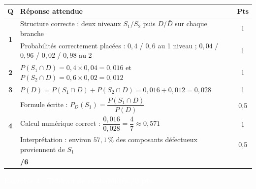 \documentclass[10pt,a4paper]{article}
\newcommand{\exotitle}[2]{%
  \noindent\colorbox{exoheader}{%
    \parbox{\dimexpr\linewidth-2\fboxsep\relax}{%
      \textcolor{white}{\textbf{\large #1 \hfill #2}}%
    }%
  }%
}
\begin{document}
\begin{tabularx}{\linewidth}{|c|X|c|}
  \hline
  \rowcolor{exolight}
  \textbf{Q} & \textbf{Réponse attendue} & \textbf{Pts} \\
  \hline
  \multirow{2}{*}{\textbf{1}}
    & Structure correcte : deux niveaux $S_1$/$S_2$ puis $D$/$\bar{D}$ sur chaque branche & 1 \\
  \cline{2-3}
    & Probabilités correctement placées : $0{,}4$ / $0{,}6$ au 1\up{er} niveau ; $0{,}04$ / $0{,}96$ / $0{,}02$ / $0{,}98$ au 2\up{e} & 1 \\
  \hline
  \textbf{2} & $P(S_1\cap D) = 0{,}4\times 0{,}04 = 0{,}016$ \quad et \quad $P(S_2\cap D) = 0{,}6\times 0{,}02 = 0{,}012$ & 1 \\
  \hline
  \textbf{3} & $P(D) = P(S_1\cap D) + P(S_2\cap D) = 0{,}016 + 0{,}012 = 0{,}028$ & 1 \\
  \hline
  \multirow{3}{*}{\textbf{4}}
    & Formule écrite : $P_D(S_1) = \dfrac{P(S_1\cap D)}{P(D)}$ & 0,5 \\
  \cline{2-3}
    & Calcul numérique correct : $\dfrac{0{,}016}{0{,}028} = \dfrac{4}{7} \approx 0{,}571$ & 1 \\
  \cline{2-3}
    & Interprétation : environ $57{,}1\,\%$ des composants défectueux proviennent de $S_1$ & 0,5 \\
  \hline
  \rowcolor{totalrow}
  \multicolumn{2}{|r|}{\textbf{Sous-total Exercice 3}} & \textbf{/6} \\
  \hline
\end{tabularx}

\vspace{3mm}

\exotitle{Exercice 4 : Tableau de probabilités}{/6 pts}

\vspace{1mm}
\end{document}
